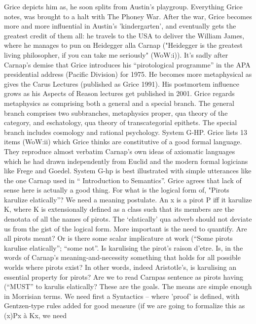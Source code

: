\documentclass[10pt,titlepage]{book}
\begin{document}
Grice depicts him as, he soon splits from  Austin's playgroup. Everything 
Grice notes, was brought to a halt with The  Phoney War. After the war, Grice 
becomes more and more influential in Austin's  'kindergarten', and 
eventually gets the greatest credit of them all: he travels  to the USA to deliver 
the William James, where he manages to pun on Heidegger  alla 
Carnap  ("Heidegger is the greatest living philosopher, if you can take me 
seriously"  (WoW:i)). It’s sadly after Carnap’s demise that Grice 
introduces his  “pirotological programme” in the APA presidential address (Pacific 
Division) for  1975. He becomes more metaphysical as gives the Carus Lectures 
(published as  Grice 1991). His postmortem influence grows as his Aspects 
of Reason lectures  get published  in  2001. 
Grice  regards metaphysics as comprising both a general and a special 
branch. The  general branch comprises two subbranches, metaphysics proper, qua 
theory of the  category, and eschatology, qua theory of transcategorial 
epithets. The special  branch includes cosmology and rational psychology.  
System  G-HP. Grice lists 13 items (WoW:ii) which Grice thinks are 
constitutive of a  good formal language. They reproduce almost verbatim Carnap’s own 
ideas of  axiomatic languages which he had drawn independently from Euclid 
and the modern  formal logicians like Frege and Goedel. System G-hp is best 
illustrated with  simple utterances like the one Carnap used in “
Introduction to Semantics”. Grice  agrees that lack of sense here is actually a good 
thing. For what is the logical  form of, "Pirots karulize elatically”? We need 
a meaning postulate. An x is a  pirot P iff it karulize K,  where K is 
extensionally defined as a class such that its members are the  denotata of all 
the names of pirots. The ‘elatically’ qua adverb should not  deviate us 
from the gist of the logical form. More important is the need to  quantify. Are 
all pirots meant? Or is there some scalar implicature at work  (“Some 
pirots karulise elatically”; 
“some not”. Is karulising the pirot’s  raison d’etre. Is, in the words of 
Carnap’s meaning-and-necessity something that  holds for all possible 
worlds where pirots exist? In other words, indeed  Aristotle’s, is karulising an 
essential property for pirots? Are we to read  Carnpas sentence as pirots 
having (“MUST” to karulis elatically? These are the  goals. The means are 
simple enough in Morrisian terms. We need first a   
Syntactics  – where 'proof' is defined, with Gentzen-type rules added for 
good measure (if  we are going to formalize this as (x)Px à  Kx, we need 
\end{document}
